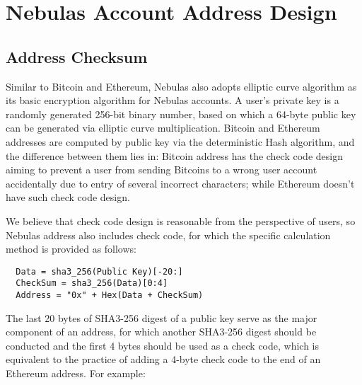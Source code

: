 \section{Nebulas Account Address Design}

\subsection{Address Checksum}

Similar to Bitcoin and Ethereum, Nebulas also adopts elliptic curve algorithm as its basic encryption algorithm for Nebulas accounts. A user’s private key is a randomly generated 256-bit binary number, based on which a 64-byte public key can be generated via elliptic curve multiplication. Bitcoin and Ethereum addresses are computed by public key via the deterministic Hash algorithm, and the difference between them lies in: Bitcoin address has the check code design aiming to prevent a user from sending Bitcoins to a wrong user account accidentally due to entry of several incorrect characters; while Ethereum doesn’t have such check code design.


We believe that check code design is reasonable from the perspective of users, so Nebulas address also includes check code, for which the specific calculation method is provided as follows:


\begin{verbatim}
  Data = sha3_256(Public Key)[-20:]
  CheckSum = sha3_256(Data)[0:4]
  Address = "0x" + Hex(Data + CheckSum)
\end{verbatim}


The last 20 bytes of SHA3-256 digest of a public key serve as the major component of an address, for which another SHA3-256 digest should be conducted and the first 4 bytes should be used as a check code, which is equivalent to the practice of adding a 4-byte check code to the end of an Ethereum address. For example:


